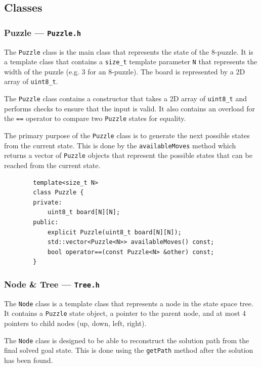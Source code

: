 \documentclass[12pt, english]{article}
\begin{document}
    \subsection{Classes}

    \subsubsection{Puzzle --- \texttt{Puzzle.h}}
    The \lstinline|Puzzle| class is the main class that represents the state of the 8-puzzle.
    It is a template class that contains a \lstinline|size_t| template parameter
    \lstinline|N| that represents the width of the puzzle (e.g. 3 for an 8-puzzle).
    The board is represented by a 2D array of \lstinline|uint8_t|.

    The \lstinline|Puzzle| class contains a constructor that takes a 2D array of 
    \lstinline|uint8_t| and performs checks to ensure that the input is valid.
    It also contains an overload for the \lstinline|==| operator to compare two
    \lstinline|Puzzle| states for equality.

    The primary purpose of the \lstinline|Puzzle| class is to generate the next
    possible states from the current state. This is done by the \lstinline|availableMoves|
    method which returns a vector of \lstinline|Puzzle| objects that represent the
    possible states that can be reached from the current state.

    \begin{lstlisting}
        template<size_t N>
        class Puzzle {
        private:
            uint8_t board[N][N];
        public:
            explicit Puzzle(uint8_t board[N][N]);
            std::vector<Puzzle<N>> availableMoves() const;
            bool operator==(const Puzzle<N> &other) const;
        }
    \end{lstlisting}

    \subsubsection{Node \& Tree --- \texttt{Tree.h}}
    The \lstinline|Node| class is a template class that represents a node in the state space tree.
    It contains a \lstinline|Puzzle| state object, a pointer to the parent node, and at most
    4 pointers to child nodes (up, down, left, right).

    The \lstinline|Node| class is designed to be able to reconstruct the solution path
    from the final solved goal state. This is done using the \lstinline|getPath| method
    after the solution has been found.
\end{document}
